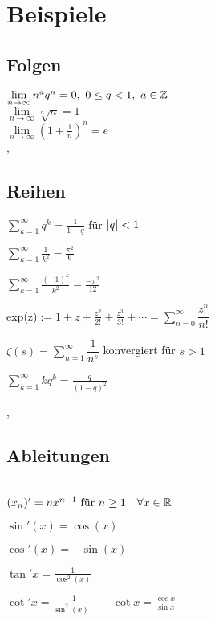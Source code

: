 \section{Beispiele}

\subsection{Folgen}

\Bsp[2.2.3] $\lim\limits_{n \rightarrow \infty} n^{a}q^{n} = 0, \ 0 \leq q < 1, \ a \in \mathbb{Z}$ \\
\Bsp[2.2.5] $\lim\limits_{n \rightarrow \infty} \sqrt[n]{n} = 1$ \\
\Bsp[2.2.6] $\lim\limits_{n \rightarrow \infty} (1 + \frac{1}{n})^n = e$ \\

\sep

\subsection{Reihen}

\Bsp[2.7.2]  $\sum_{k=1}^{\infty} q^k = \frac{1}{1-q} $ für $\left\lvert q \right\rvert < 1$

\Bsp $\sum_{k=1}^{\infty} \frac{1}{k^2} = \frac{\pi^2}{6}$ 

\Bsp  $\sum_{k=1}^{\infty} \frac{(-1)^k}{k^2} = \frac{-\pi^2}{12}$ 

\Bsp exp(z)$ := 1 + z + \frac{z^2}{2!} + \frac{z^3}{3!} + \cdots = \sum_{n=0}^{\infty} \dfrac{z^{n}}{n!}$

\Bsp $\zeta(s) =  \sum_{n=1}^{\infty} \dfrac{1}{n^s}$ konvergiert für $s > 1$

\Bsp $\sum_{k=1}^{\infty} k q^k = \frac{q}{(1- q)^2}$ 

\sep

\subsection{Ableitungen}

\Bsp[4.1.10] \\
\((x_n)' = n x^{n - 1}$ für $ n \geq 1\quad \forall x \in \R \)

\( \sin'(x) = \cos(x) \)

\( \cos'(x) = -\sin(x) \)

\(\tan' x = \frac{1}{\cos^2 (x)} \)

\(\cot' x = \frac{-1}{\sin^2 (x)} \quad \quad \cot x = \frac{\cos x}{\sin x}  \) \\

